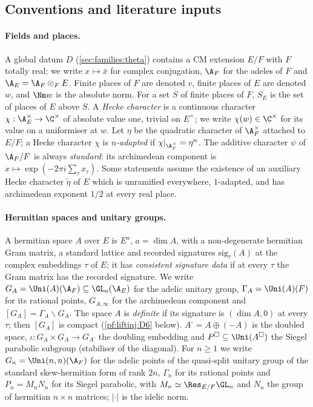 \subsection{Conventions and literature inputs}\label{sec:pf:liftinj:conv}

\paragraph{Fields and places.}
A global datum $D$ (\cref{sec:families:theta}) contains a CM extension $E/F$ with $F$ totally real; we write
$x\mapsto\bar x$ for complex conjugation, $\A_F$ for the adeles of $F$ and $\A_E=\A_F\otimes_FE$. Finite places of
$F$ are denoted $v$, finite places of $E$ are denoted $w$, and $\Nm w$ is the absolute norm. For a set $S$ of finite
places of $F$, $S_E$ is the set of places of $E$ above $S$. A \emph{Hecke character} is a continuous character
$\chi:\A_E^\times\to\C^{\times}$ of absolute value one, trivial on $E^\times$; we write $\chi(w)\in\C^\times$ for
its value on a uniformiser at $w$. Let $\eta$ be the quadratic character of $\A_F^\times$ attached to $E/F$; a Hecke
character $\chi$ is \emph{$n$-adapted} if $\chi|_{\A_F^\times}=\eta^n$. The additive character $\psi$ of $\A_F/F$ is always
\emph{standard}: its archimedean component is $x\mapsto\exp(-2\pi i\sum_\tau x_\tau)$. Some statements assume the existence of
an auxiliary Hecke character $\tilde\eta$ of $E$ which is unramified everywhere, $1$-adapted, and has archimedean exponent $1/2$
at every real place.

\paragraph{Hermitian spaces and unitary groups.}
A hermitian space $A$ over $E$ is $E^a$, $a=\dim A$, with a non-degenerate hermitian Gram matrix, a standard lattice and
recorded signatures $\mathrm{sig}_\tau(A)$ at the complex embeddings $\tau$ of $E$; it has \emph{consistent signature data} if at every
$\tau$ the Gram matrix has the recorded signature. We write $G_A=\Uni(A)(\A_F)\subseteq\GL_a(\A_E)$ for the adelic unitary group,
$\Gamma_A=\Uni(A)(F)$ for its rational points, $G_{A,\infty}$ for the archimedean component and $[G_A]=\Gamma_A\backslash G_A$. The
space $A$ is \emph{definite} if its signature is $(\dim A,0)$ at every $\tau$; then $[G_A]$ is compact (\ref{pf:liftinj:D6} below).
$A^\square=A\oplus(-A)$ is the doubled space, $\iota:G_A\times G_A\to G_{A^\square}$ the doubling embedding and
$P^\square\subseteq\Uni(A^\square)$ the Siegel parabolic subgroup (stabiliser of the diagonal). For $n\ge1$ we write
$G_n=\Uni(n,n)(\A_F)$ for the adelic points of the quasi-split unitary group of the standard skew-hermitian form of rank $2n$,
$\Gamma_n$ for its rational points and $P_n=M_nN_n$ for its Siegel parabolic, with $M_n\simeq\Res_{E/F}\GL_n$ and $N_n$ the group
of hermitian $n\times n$ matrices; $|\cdot|$ is the idelic norm.

